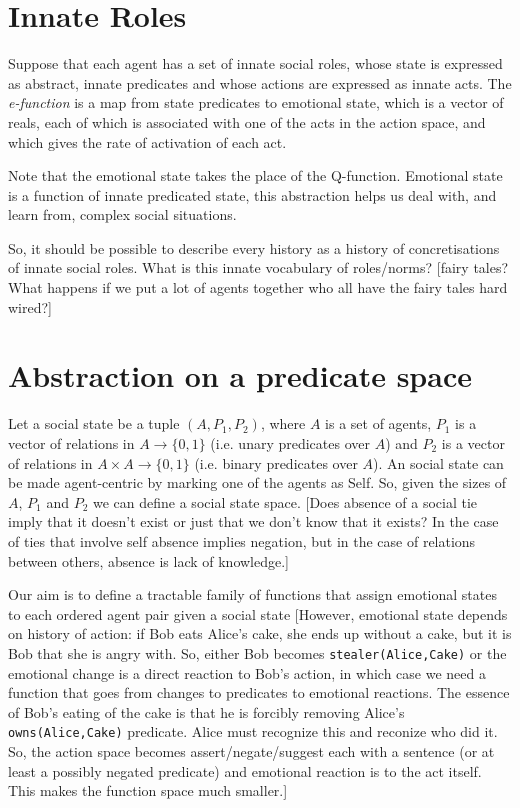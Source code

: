 \documentclass[a4paper]{article}
\begin{document}
\section{Innate Roles}

Suppose that each agent has a set of innate social roles, whose state is expressed as abstract, innate predicates and whose actions are expressed as innate acts. The \textit{e-function} is a map from state predicates to emotional state, which is a vector of reals, each of which is associated with one of the acts in the action space, and which gives the rate of activation of each act.

Note that the emotional state takes the place of the Q-function. Emotional state is a function of innate predicated state, this abstraction helps us deal with, and learn from, complex social situations.
 
So, it should be possible to describe every history as a history of concretisations of innate social roles. What is this innate vocabulary of roles/norms? [fairy tales? What happens if we put a lot of agents together who all have the fairy tales hard wired?]

\section{Abstraction on a predicate space}

Let a social state be a tuple $(A, P_1, P_2)$, where $A$ is a set of agents, $P_1$ is a vector of relations in $A \to \{0,1\}$ (i.e. unary predicates over $A$) and $P_2$ is a vector of relations in $A \times A \to \{0,1\}$ (i.e. binary predicates over $A$). An social state can be made agent-centric by marking one of the agents as Self. So, given the sizes of $A$, $P_1$ and $P_2$ we can define a social state space. [Does absence of a social tie imply that it doesn't exist or just that we don't know that it exists? In the case of ties that involve self absence implies negation, but in the case of relations between others, absence is lack of knowledge.]

Our aim is to define a tractable family of functions that assign emotional states to each ordered agent pair given a social state [However, emotional state depends on history of action: if Bob eats Alice's cake, she ends up without a cake, but it is Bob that she is angry with. So, either Bob becomes \texttt{stealer(Alice,Cake)} or the emotional change is a direct reaction to Bob's action, in which case we need a function that goes from changes to predicates to emotional reactions. The essence of Bob's eating of the cake is that he is forcibly removing Alice's \texttt{owns(Alice,Cake)} predicate. Alice must recognize this and reconize who did it. So, the action space becomes assert/negate/suggest each with a sentence (or at least a possibly negated predicate) and emotional reaction is to the act itself. This makes the function space much smaller.]
\end{document}
